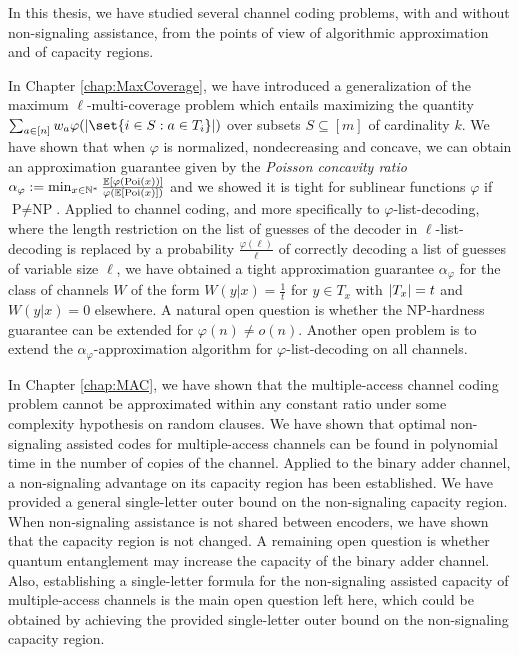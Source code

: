 In this thesis, we have studied several channel coding problems, with and without non-signaling assistance, from the points of view of algorithmic approximation and of capacity regions.

In Chapter \ref{chap:MaxCoverage}, we have introduced a generalization of the maximum $\ell$-multi-coverage problem which entails maximizing the quantity $\sum_{a \in [n]}  w_a\varphi(\abs{\set{i \in S : a \in T_i}})$ over subsets $S \subseteq [m]$ of cardinality $k$. We have shown that when $\varphi$ is normalized, nondecreasing and concave, we can obtain an approximation guarantee given by the \emph{Poisson concavity ratio} $\alpha_{\varphi} := \min_{x \in \mathbb{N}^*} \frac{\mathbb{E}[\varphi(\operatorname{\text{Poi}}(x))]}{\varphi(\mathbb{E}[\operatorname{\text{Poi}}(x)])}$ and we showed it is tight for sublinear functions $\varphi$ if $\textrm{P}\not=\textrm{NP}$. Applied to channel coding, and more specifically to $\varphi$-list-decoding, where the length restriction on the list of guesses of the decoder in $\ell$-list-decoding is replaced by a probability $\frac{\varphi(\ell)}{\ell}$ of correctly decoding a list of guesses of variable size $\ell$, we have obtained a tight approximation guarantee $\alpha_{\varphi}$ for the class of channels $W$ of the form $W(y|x) = \frac{1}{t}$ for $y \in T_x$ with $\abs{T_x}=t$ and $W(y|x) = 0$ elsewhere. A natural open question is whether the \textrm{NP}-hardness guarantee can be extended for $\varphi(n) \not= o(n)$. Another open problem is to extend the $\alpha_{\varphi}$-approximation algorithm for $\varphi$-list-decoding on all channels.

In Chapter \ref{chap:MAC}, we have shown that the multiple-access channel coding problem cannot be approximated within any constant ratio under some complexity hypothesis on random clauses. We have shown that optimal non-signaling assisted codes for multiple-access channels can be found in polynomial time in the number of copies of the channel. Applied to the binary adder channel, a non-signaling advantage on its capacity region has been established. We have provided a general single-letter outer bound on the non-signaling capacity region. When non-signaling assistance is not shared between encoders, we have shown that the capacity region is not changed. A remaining open question is whether quantum entanglement may increase the capacity of the binary adder channel. Also, establishing a single-letter formula for the non-signaling assisted capacity of multiple-access channels is the main open question left here, which could be obtained by achieving the provided single-letter outer bound on the non-signaling capacity region.

